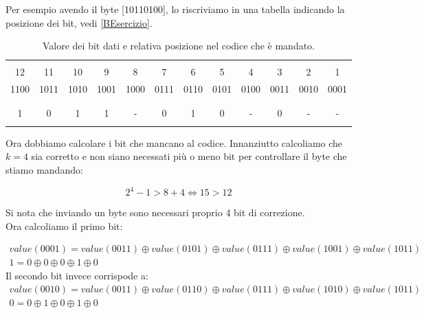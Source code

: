 \documentclass{article}
\begin{document}
Per esempio avendo il byte [10110100], lo riscriviamo in una tabella indicando la posizione dei bit, vedi \autoref{BEsercizio}.

\begin{table}[h]
	\centering
	\begin{tabular}{|c|c|c|c|c|c|c|c|c|c|c|c|}

		\hline
		&  &  &  &  &  &  &  &  &  &  & \\
	  12 & 11 & 10 & 9 & 8 & 7 & 6 & 5 & 4 & 3 & 2 & 1  \\

		1100 & 1011 & 1010 & 1001 & 1000 & 0111 & 0110 & 0101 & 0100 & 0011 & 0010 & 0001 \\
	  &  &  &  &  &  &  &  &  &  &  &  \\
		\hline
		&  &  &  &  &  &  &  &  &  &  &  \\

    1 & 0 & 1 & 1 & - & 0 & 1 & 0 & - & 0 & - & -\\

		&  &  &  &  &  &  &  &  &  &  &  \\
		\hline

	\end{tabular}
	\caption{Valore dei bit dati e relativa posizione nel codice che è mandato.}
	\label{BEsercizio}
\end{table}

Ora dobbiamo calcolare i bit che mancano al codice. Innanziutto calcoliamo che $k=4$ sia corretto e non siano necessati più o meno bit per controllare il byte che stiamo mandando:

\begin{equation*}
		2^4-1>8+4 \iff 15>12
\end{equation*}

Si nota che inviando un byte sono necessari proprio 4 bit di correzione.\\
Ora calcoliamo il primo bit:

\begin{gather*}
	value(0001) = value(0011) \oplus value(0101) \oplus value(0111) \oplus value(1001) \oplus value(1011) \\
	1 = 0 \oplus 0 \oplus 0 \oplus 1 \oplus 0
\end{gather*}
Il secondo bit invece corrispode a:
\begin{gather*}
	value(0010)= value(0011) \oplus value(0110) \oplus value(0111) \oplus value(1010) \oplus value(1011) \\
	0 = 0 \oplus 1 \oplus 0 \oplus 1 \oplus 0
\end{gather*}
\end{document}

